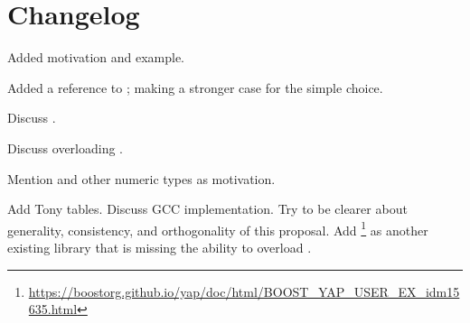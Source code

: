 \section{Changelog}
\begin{revision}
  \item Added  motivation and example.
  \item Added a reference to \cite{P0927R0}; making a stronger case for the simple choice.
\end{revision}

\begin{revision}
  \item Discuss .
  \item Discuss overloading .
  \item Mention  and other numeric types as motivation.
\end{revision}

\begin{revision}
  \todo Add Tony tables.
  \todo Discuss GCC implementation.
  \todo Try to be clearer about generality, consistency, and orthogonality of this proposal.
  \todo Add \footnote{\url{https://boostorg.github.io/yap/doc/html/BOOST_YAP_USER_EX_idm15635.html}} as another existing library that is missing the ability to overload .
\end{revision}

